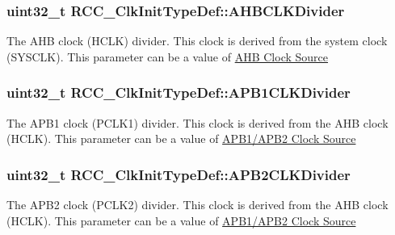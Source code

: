 \subsubsection[{\texorpdfstring{A\+H\+B\+C\+L\+K\+Divider}{AHBCLKDivider}}]{\setlength{\rightskip}{0pt plus 5cm}uint32\+\_\+t R\+C\+C\+\_\+\+Clk\+Init\+Type\+Def\+::\+A\+H\+B\+C\+L\+K\+Divider}\hypertarget{struct_r_c_c___clk_init_type_def_abd9bcaa8dcf4b816462ee2930ab3e993}{}\label{struct_r_c_c___clk_init_type_def_abd9bcaa8dcf4b816462ee2930ab3e993}
The A\+HB clock (H\+C\+LK) divider. This clock is derived from the system clock (S\+Y\+S\+C\+LK). This parameter can be a value of \hyperlink{group___r_c_c___a_h_b___clock___source}{A\+HB Clock Source} 
\subsubsection[{\texorpdfstring{A\+P\+B1\+C\+L\+K\+Divider}{APB1CLKDivider}}]{\setlength{\rightskip}{0pt plus 5cm}uint32\+\_\+t R\+C\+C\+\_\+\+Clk\+Init\+Type\+Def\+::\+A\+P\+B1\+C\+L\+K\+Divider}\hypertarget{struct_r_c_c___clk_init_type_def_a21ceb024102adc3c4dc7eb270cf02ebd}{}\label{struct_r_c_c___clk_init_type_def_a21ceb024102adc3c4dc7eb270cf02ebd}
The A\+P\+B1 clock (P\+C\+L\+K1) divider. This clock is derived from the A\+HB clock (H\+C\+LK). This parameter can be a value of \hyperlink{group___r_c_c___a_p_b1___a_p_b2___clock___source}{A\+P\+B1/\+A\+P\+B2 Clock Source} 
\subsubsection[{\texorpdfstring{A\+P\+B2\+C\+L\+K\+Divider}{APB2CLKDivider}}]{\setlength{\rightskip}{0pt plus 5cm}uint32\+\_\+t R\+C\+C\+\_\+\+Clk\+Init\+Type\+Def\+::\+A\+P\+B2\+C\+L\+K\+Divider}\hypertarget{struct_r_c_c___clk_init_type_def_aa75c110cd93855d49249f38da8cf94f7}{}\label{struct_r_c_c___clk_init_type_def_aa75c110cd93855d49249f38da8cf94f7}
The A\+P\+B2 clock (P\+C\+L\+K2) divider. This clock is derived from the A\+HB clock (H\+C\+LK). This parameter can be a value of \hyperlink{group___r_c_c___a_p_b1___a_p_b2___clock___source}{A\+P\+B1/\+A\+P\+B2 Clock Source} 
